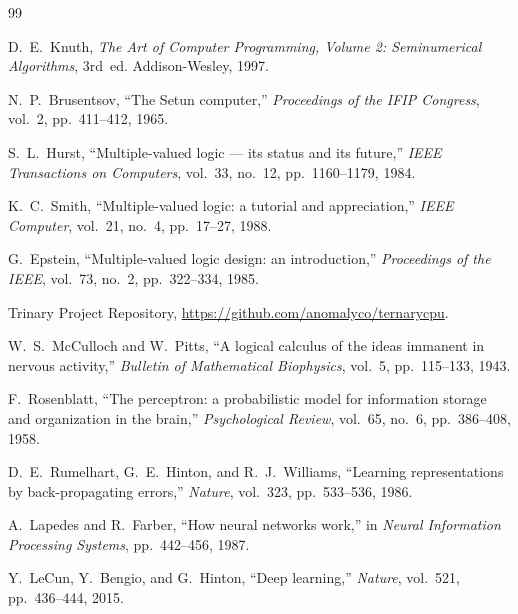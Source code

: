 \documentclass[10pt,a4paper,twoside]{book}
\begin{document}
\begin{thebibliography}{99}

D.~E.~Knuth, \emph{The Art of Computer Programming, Volume 2: Seminumerical
Algorithms}, 3rd~ed. Addison-Wesley, 1997.

N.~P.~Brusentsov, ``The Setun computer,'' \emph{Proceedings of the IFIP Congress},
vol.~2, pp.~411--412, 1965.

S.~L.~Hurst, ``Multiple-valued logic --- its status and its future,''
\emph{IEEE Transactions on Computers}, vol.~33, no.~12, pp.~1160--1179, 1984.

K.~C.~Smith, ``Multiple-valued logic: a tutorial and appreciation,''
\emph{IEEE Computer}, vol.~21, no.~4, pp.~17--27, 1988.

G.~Epstein, ``Multiple-valued logic design: an introduction,''
\emph{Proceedings of the IEEE}, vol.~73, no.~2, pp.~322--334, 1985.

Trinary Project Repository, \url{https://github.com/anomalyco/ternarycpu}.

W.~S.~McCulloch and W.~Pitts, ``A logical calculus of the ideas immanent in nervous
activity,'' \emph{Bulletin of Mathematical Biophysics}, vol.~5, pp.~115--133, 1943.

F.~Rosenblatt, ``The perceptron: a probabilistic model for information storage and
organization in the brain,'' \emph{Psychological Review}, vol.~65, no.~6,
pp.~386--408, 1958.

D.~E.~Rumelhart, G.~E.~Hinton, and R.~J.~Williams, ``Learning representations by
back-propagating errors,'' \emph{Nature}, vol.~323, pp.~533--536, 1986.

A.~Lapedes and R.~Farber, ``How neural networks work,'' in \emph{Neural Information
Processing Systems}, pp.~442--456, 1987.

Y.~LeCun, Y.~Bengio, and G.~Hinton, ``Deep learning,'' \emph{Nature}, vol.~521,
pp.~436--444, 2015.

\end{thebibliography}
\end{document}
